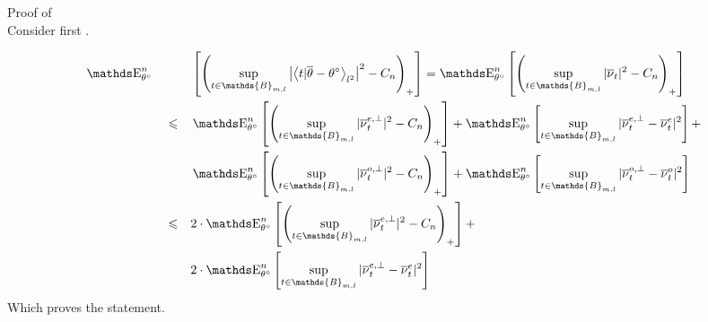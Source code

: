 \begin{pro}{Proof of \\}
Consider first .

\begin{alignat*}{3}
& \E_{\theta^{\circ}}^{n} && && \left[ \left(\sup\limits_{t \in \mathds{B}_{m, l}} \left\vert\left\langle t \vert \overline{\theta} - \theta^{\circ}\right\rangle_{l^{2}} \right\vert^{2} - C_{n} \right)_{+} \right] = \E_{\theta^{\circ}}^{n}\left[ \left(\sup\limits_{t \in \mathds{B}_{m, l}} \vert \overline{\nu}_{t} \vert^{2} - C_{n} \right)_{+} \right]\notag\\
& && \leq && \E_{\theta^{\circ}}^{n}\left[ \left(\sup\limits_{t \in \mathds{B}_{m, l}} \vert \overline{\nu}^{e, \perp}_{t} \vert^{2} - C_{n} \right)_{+} \right] + \E_{\theta^{\circ}}^{n}\left[ \sup\limits_{t \in \mathds{B}_{m, l}} \vert \overline{\nu}^{e, \perp}_{t} - \overline{\nu}^{e}_{t} \vert^{2} \right] + \notag\\
& && &&\E_{\theta^{\circ}}^{n}\left[ \left(\sup\limits_{t \in \mathds{B}_{m, l}} \vert \overline{\nu}^{o, \perp}_{t} \vert^{2} - C_{n} \right)_{+} \right] + \E_{\theta^{\circ}}^{n}\left[ \sup\limits_{t \in \mathds{B}_{m, l}} \vert \overline{\nu}^{o, \perp}_{t} - \overline{\nu}^{o}_{t} \vert^{2} \right] \notag\\
& && \leq && 2 \cdot \E_{\theta^{\circ}}^{n}\left[ \left(\sup\limits_{t \in \mathds{B}_{m, l}} \vert \overline{\nu}^{e, \perp}_{t} \vert^{2} - C_{n} \right)_{+} \right] +\\
& && && 2 \cdot \E_{\theta^{\circ}}^{n}\left[ \sup\limits_{t \in \mathds{B}_{m, l}} \vert \overline{\nu}^{e, \perp}_{t} - \overline{\nu}^{e}_{t} \vert^{2} \right]
\end{alignat*}
Which proves the statement.


\end{pro}
